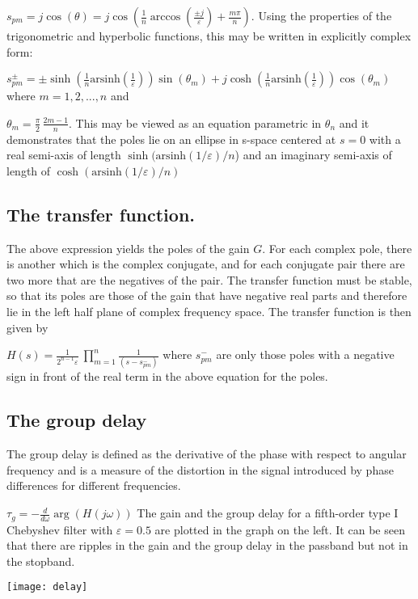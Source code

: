 \documentclass[journal abbreviation, manuscript]{copernicus}
\begin{document}
$s_{pm}=j\cos(\theta)=j\cos\left(\frac{1}{n}\arccos\left(\frac{\pm j}{\varepsilon}\right)+\frac{m\pi}{n}\right).$
Using the properties of the trigonometric and hyperbolic functions, this may be written in explicitly complex form:

$s_{pm}^\pm=\pm \sinh\left(\frac{1}{n}\mathrm{arsinh}\left(\frac{1}{\varepsilon}\right)\right)\sin(\theta_m)+j  \cosh\left(\frac{1}{n}\mathrm{arsinh}\left(\frac{1}{\varepsilon}\right)\right)\cos(\theta_m)$
where $m = 1, 2,..., n$  and

$\theta_m=\frac{\pi}{2}\,\frac{2m-1}{n}$.
This may be viewed as an equation parametric in $\theta_n$ and it demonstrates that the poles lie on an ellipse in s-space centered at $s = 0$ with a real semi-axis of length $\sinh(\mathrm{arsinh}(1/\varepsilon)/n$) and an imaginary semi-axis of length of $\cosh(\mathrm{arsinh}(1/\varepsilon)/n)$
\subsection{The transfer function.}
The above expression yields the poles of the gain $G$. For each complex pole, there is another which is the complex conjugate, and for each conjugate pair there are two more that are the negatives of the pair. The transfer function must be stable, so that its poles are those of the gain that have negative real parts and therefore lie in the left half plane of complex frequency space. The transfer function is then given by

$H(s)= \frac{1}{2^{n-1}\varepsilon}\ \prod_{m=1}^{n} \frac{1}{(s-s_{pm}^-)}$
where $s_{pm}^-$ are only those poles with a negative sign in front of the real term in the above equation for the poles.
\subsection{The group delay}
The group delay is defined as the derivative of the phase with respect to angular frequency and is a measure of the distortion in the signal introduced by phase differences for different frequencies.

$\tau_g=-\frac{d}{d\omega}\arg(H(j\omega))$
The gain and the group delay for a fifth-order type I Chebyshev filter with $\varepsilon=0.5$ are plotted in the graph on the left. It can be seen that there are ripples in the gain and the group delay in the passband but not in the stopband.

\texttt{[image: delay]}

\end{document}

